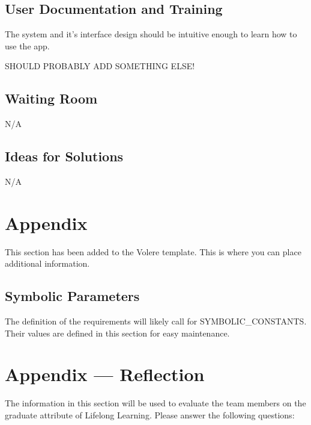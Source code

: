\documentclass[12pt, titlepage]{article}
\begin{document}
\subsection{User Documentation and Training}

The system and it's interface design should be intuitive enough to learn how to use the app.

SHOULD PROBABLY ADD SOMETHING ELSE!

\subsection{Waiting Room}

N/A

\subsection{Ideas for Solutions}

N/A





\newpage

\section{Appendix}

This section has been added to the Volere template.  This is where you can place
additional information.

\subsection{Symbolic Parameters}

The definition of the requirements will likely call for SYMBOLIC\_CONSTANTS.
Their values are defined in this section for easy maintenance.

\section{Appendix --- Reflection}

The information in this section will be used to evaluate the team members on the
graduate attribute of Lifelong Learning.  Please answer the following questions:
\end{document}
